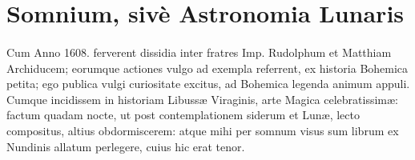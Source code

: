 \documentclass[a4paper, 11pt, oneside, polutonikogreek, german]{article}
\begin{document}
\section{Somnium, sivè Astronomia Lunaris}
\paragraph{}
Cum Anno 1608. ferverent dissidia inter fratres Imp. Rudolphum et Matthiam Archiducem; eorumque actiones vulgo ad exempla referrent, ex historia Bohemica petita; ego publica vulgi curiositate excitus, ad Bohemica legenda animum appuli. Cumque incidissem in historiam Libussæ Viraginis, arte Magica celebratissimæ: factum quadam nocte, ut post contemplationem siderum et Lunæ, lecto compositus, altius obdormiscerem: atque mihi per somnum visus sum librum ex Nundinis allatum perlegere, cuius hic erat tenor.
\end{document}
